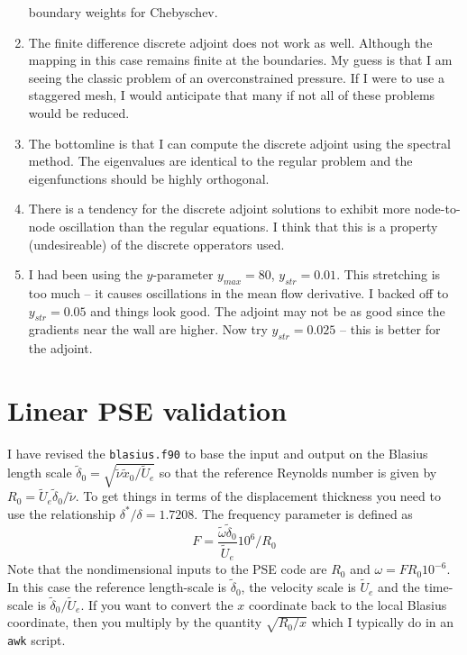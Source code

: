 \documentclass[12pt]{article}
\begin{document}
\begin{enumerate}
boundary weights for Chebyschev.
\item The finite difference discrete adjoint does not work as well.  Although
the mapping in this case remains finite at the boundaries. My guess is that I
am seeing the classic problem of an overconstrained pressure.  If I were to
use a staggered mesh, I would anticipate that many if not all of these
problems would be reduced.
\item The bottomline is that I can compute the discrete adjoint using the
spectral method.  The eigenvalues are identical to the regular problem and the
eigenfunctions should be highly orthogonal.
\item There is a tendency for the discrete adjoint solutions to exhibit more
node-to-node oscillation than the regular equations.  I think that this is a
property (undesireable) of the discrete opperators used.
\item I had been using the $y$-parameter $y_{max}=80$, $y_{str}=0.01$.  This
stretching is too much -- it causes oscillations in the mean flow derivative.
I backed off to $y_{str}=0.05$ and things look good.  The adjoint may not be
as good since the gradients near the wall are higher.  Now try $y_{str}=0.025$
-- this is better for the adjoint.
\end{enumerate} 

\section{Linear PSE validation}

I have revised the {\tt blasius.f90} to base the input and output on the
Blasius length scale $\tilde\delta_0 = \sqrt{\tilde\nu \tilde x_0 / \tilde
U_e}$ so that the reference Reynolds number is given by $R_0 = \tilde U_e
\tilde\delta_0 / \tilde\nu$.  To get things in terms of the displacement
thickness you need to use the relationship $\delta^*/\delta = 1.7208$.  The
frequency parameter is defined as
%
\begin{equation}
  F = \frac{\tilde\omega \tilde\delta_0}{\tilde U_e} 10^6 / R_0
\end{equation}
%
Note that the nondimensional inputs to the PSE code are $R_0$ and $\omega = F
R_0 10^{-6}$.  In this case the reference length-scale is $\tilde\delta_0$,
the velocity scale is $\tilde U_e$ and the time-scale is
$\tilde\delta_0/\tilde U_e$.  If you want to convert the $x$ coordinate back
to the local Blasius coordinate, then you multiply by the quantity
$\sqrt{R_0/x}$ which I typically do in an {\tt awk} script.
\end{document}
